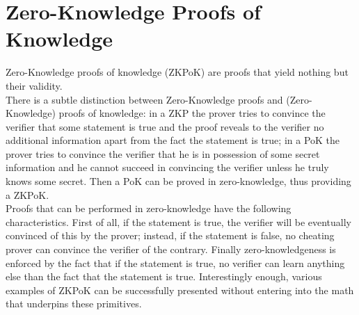 \section{Zero-Knowledge Proofs of Knowledge}
\label{sec::ZKPoK}
Zero-Knowledge proofs of knowledge (ZKPoK) are proofs that yield nothing but their validity.\\
There is a subtle distinction between Zero-Knowledge proofs and (Zero-Knowledge) proofs of knowledge: in a ZKP the prover tries to convince the verifier that some statement is true and the proof reveals to the verifier no additional information apart from the fact the statement is true; in a PoK the prover tries to convince the verifier that he is in possession of some secret information and he cannot succeed in convincing the verifier unless he truly knows some secret. Then a PoK can be proved in zero-knowledge, thus providing a ZKPoK.\\
Proofs that can be performed in zero-knowledge have the following characteristics. First of all, if the statement is true, the verifier will be eventually convinced of this by the prover; instead, if the statement is false, no cheating prover can convince the verifier of the contrary. Finally zero-knowledgeness is enforced by the fact that if the statement is true, no verifier can learn anything else than the fact that the statement is true. Interestingly enough, various examples of ZKPoK can be successfully presented without entering into the math that underpins these primitives.
